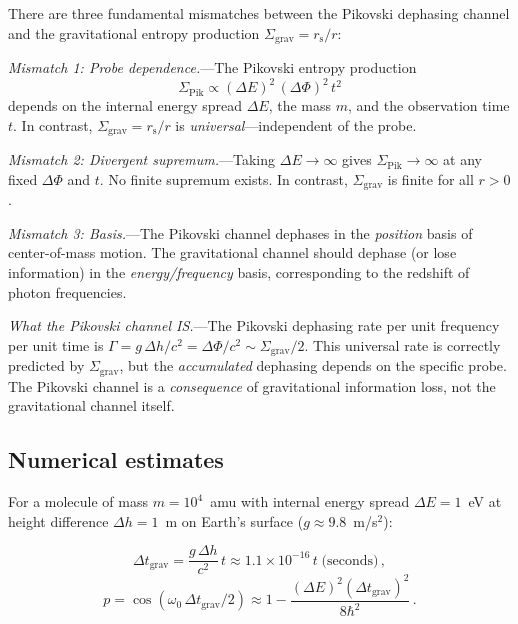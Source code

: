 \documentclass[aps,prd,preprint,superscriptaddress,longbibliography]{revtex4-2}
\newcommand{\rs}{r_{\mathrm{s}}}
\newcommand{\Sgrav}{\Sigma_{\mathrm{grav}}}
\begin{document}
There are three fundamental mismatches between the Pikovski dephasing
channel and the gravitational entropy production $\Sgrav = \rs/r$:

\emph{Mismatch 1: Probe dependence.}---The Pikovski entropy production
\begin{equation}
  \Sigma_{\mathrm{Pik}} \propto (\Delta E)^2\,(\Delta\Phi)^2\,t^2
  \label{eq:Sigma_Pik}
\end{equation}
depends on the internal energy spread $\Delta E$, the mass $m$,
and the observation time $t$.  In contrast, $\Sgrav = \rs/r$
is \emph{universal}---independent of the probe.

\emph{Mismatch 2: Divergent supremum.}---Taking
$\Delta E \to \infty$ gives $\Sigma_{\mathrm{Pik}} \to \infty$
at any fixed $\Delta\Phi$ and $t$.  No finite supremum exists.
In contrast, $\Sgrav$ is finite for all $r > 0$.

\emph{Mismatch 3: Basis.}---The Pikovski channel dephases in the
\emph{position} basis of center-of-mass motion.  The gravitational
channel should dephase (or lose information) in the
\emph{energy/frequency} basis, corresponding to the redshift of
photon frequencies.

\emph{What the Pikovski channel IS.}---The Pikovski dephasing rate per
unit frequency per unit time is
$\Gamma = g\,\Delta h/c^2 = \Delta\Phi/c^2 \sim \Sgrav/2$.  This
universal rate is correctly predicted by $\Sgrav$, but the
\emph{accumulated} dephasing depends on the specific probe.  The
Pikovski channel is a \emph{consequence} of gravitational information
loss, not the gravitational channel itself.

\subsection{Numerical estimates}

For a molecule of mass $m = 10^4$~amu with internal energy spread
$\Delta E = 1$~eV at height difference $\Delta h = 1$~m on Earth's
surface ($g \approx 9.8$~m/s$^2$):

\begin{equation}
  \Delta t_{\mathrm{grav}} = \frac{g\,\Delta h}{c^2}\,t
  \approx 1.1\times10^{-16}\,t\;\text{(seconds)}\,,
  \label{eq:dt_numerical}
\end{equation}
\begin{equation}
  p = \cos(\omega_0\,\Delta t_{\mathrm{grav}}/2)
  \approx 1 - \frac{(\Delta E)^2(\Delta t_{\mathrm{grav}})^2}{8\hbar^2}\,.
  \label{eq:p_numerical}
\end{equation}
\end{document}
